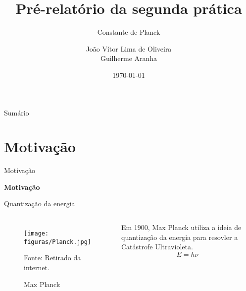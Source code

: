 \documentclass[aspectratio=169,12.5pt,xcolor=dvipsnames]{beamer}
\title{Pré-relatório da segunda prática}
\subtitle{Constante de Planck}
\author{João Vítor Lima de Oliveira\\Guilherme Aranha}
\institute
{
    Instituto de Física de São Carlos
    \\
    Universidade de São Paulo %
}
\date{\today} %
\begin{document}
\begin{frame}
    \titlepage
\end{frame}

\begin{frame}{Sumário}
    \tableofcontents
\end{frame}

\section{Motivação}

\begin{frame}{Motivação}
    \Huge{\centerline{\textbf{Motivação}}}
\end{frame}


\begin{frame}{Quantização da energia}

    \begin{columns}[c]
        \begin{figure}
          \centering
          \caption{Max Planck}
          \texttt{[image: figuras/Planck.jpg]}\par
          {\scriptsize Fonte: Retirado da internet.}
        \end{figure}

        Em 1900, Max Planck utiliza a ideia de quantização da energia para resovler a Catástrofe Ultravioleta.
        \begin{equation}
            E = h\nu
        \end{equation}
    
    \end{columns}

    
\end{frame}

\end{document}
